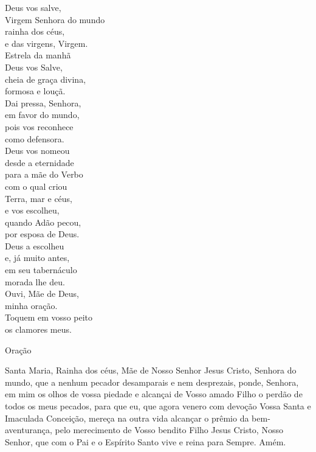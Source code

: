 \documentclass{book}
\begin{document}
\begin{multicols}{2}
    Deus vos salve, \\
    Virgem Senhora do mundo \\
    rainha dos céus, \\
    e das virgens, Virgem.
    \vspace{.2cm} \\
    Estrela da manhã \\
    Deus vos Salve, \\
    cheia de graça divina, \\
    formosa e louçã.
    \vspace{.2cm} \\
    Dai pressa, Senhora, \\
    em favor do mundo, \\
    pois vos reconhece \\
    como defensora.
    \vspace{.2cm} \\
    Deus vos nomeou \\
    desde a eternidade \\
    para a mãe do Verbo \\
    com o qual criou
    \vspace{.2cm} \\
    Terra, mar e céus, \\
    e vos escolheu, \\
    quando Adão pecou, \\
    por esposa de Deus.
    \vspace{.2cm} \\
    Deus a escolheu \\
    e, já muito antes, \\
    em seu tabernáculo \\
    morada lhe deu.
    \vspace{.2cm} \\
    Ouvi, Mãe de Deus, \\
    minha oração. \\
    Toquem em vosso peito \\
    os clamores meus.
\end{multicols}
\newpage
\begin{center}
    \textcolor{VioletRed2}{Oração}
\end{center}
\begin{flushleft}
    Santa Maria, Rainha dos céus, Mãe de Nosso Senhor Jesus Cristo, Senhora do mundo, que a nenhum pecador desamparais e nem desprezais, ponde, Senhora, em mim os olhos de vossa piedade e alcançai de Vosso amado Filho o perdão de todos os meus pecados, para que eu, que agora venero com devoção Vossa Santa e Imaculada Conceição, mereça na outra vida alcançar o prêmio da bem-aventurança, pelo merecimento de Vosso bendito Filho Jesus Cristo, Nosso Senhor, que com o Pai e o Espírito Santo vive e reina para Sempre. Amém.
\end{flushleft}
\end{document}
